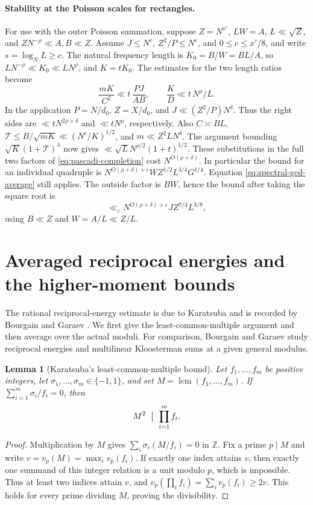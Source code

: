\documentclass[11pt]{amsart}
\numberwithin{equation}{section}
\newtheorem{lemma}[theorem]{Lemma}
\theoremstyle{remark}
\begin{document}
\paragraph{Stability at the Poisson scales for rectangles.}
For use with the outer Poisson summation, suppose
\(Z=N^{x'}\), \(L W=A\), \(L\ll\sqrt Z\),
and \(ZN^{-\rho}\ll A,B\ll Z\). Assume
\(J\le N^c\), \(Z^2/P\le N^c\), and \(0\le c\le x'/8\), and
write \(s=\log_N L\ge c\). The natural frequency length is
\(K_0=B/W=BL/A\), so
\(L N^{-\rho}\ll K_0\ll L N^\rho\), and \(K=tK_0\).
The estimates for the two length ratios become
\[
 \frac{mK}{C^2}\ll t\,\frac{PJ}{AB},\qquad
 \frac KD\ll t\,N^\rho/L .
\]
In the application \(P=N/d_0\), \(Z=X/d_0\),
and \(J\ll (Z^2/P)N^\delta\). Thus the right sides are
\(\ll t N^{2\rho+\delta}\) and \(\ll tN^\rho\), respectively.
Also \(C\asymp BL\),
\(\mathcal T\le B/\sqrt{mK}\ll(N^c/K)^{1/2}\), and
\(m\ll Z^2 L N^\delta\). The argument bounding
\(\sqrt K(1+\mathcal T)^\lambda\) now gives
\(\ll\sqrt L N^{\rho/2}(1+t)^{1/2}\).
These substitutions in the full two factors of
\eqref{eq:pascadi-completion} cost \(N^{O(\rho+\delta)}\).
In particular the bound for an individual quadruple is
\(N^{O(\rho+\delta)+\varepsilon}W Z^{1/2}L^{3/4}G^{1/4}\).
Equation \eqref{eq:spectral-gcd-average} still applies. The outside
factor is \(BW\), hence the bound after taking the square root is
\begin{equation}
 \ll_\varepsilon N^{O(\rho+\delta)+\varepsilon}
             J Z^{7/4}L^{3/8},
 \label{eq:spectral-rectangular}
\end{equation}
using \(B\ll Z\) and \(W=A/L\ll Z/L\).

\section{Averaged reciprocal energies and the higher-moment bounds}
\label{sec:higher-moments}

The rational reciprocal-energy estimate is due to Karatsuba and is
recorded by Bourgain and Garaev \cite[Lemma~4]{BGprime}. We first give the
least-common-multiple argument and then average over the actual moduli.
For comparison, Bourgain and Garaev \cite{BGrings} study reciprocal
energies and multilinear Kloosterman sums at a given general modulus.

\begin{lemma}[Karatsuba's least-common-multiple bound]
\label{lem:target-lcm}
Let \(f_1,\ldots,f_m\) be positive integers, let
\(\sigma_1,\ldots,\sigma_m\in\{-1,1\}\), and set
\(M=\operatorname{lcm}(f_1,\ldots,f_m)\).
If \(\sum_{i=1}^m \sigma_i/f_i=0\), then
\[
 M^2\ \bigm|\ \prod_{i=1}^m f_i .
\]
\end{lemma}
\begin{proof}
Multiplication by \(M\) gives \(\sum_i \sigma_i(M/f_i)=0\) in
\(\mathbb Z\).
Fix a prime \(p\mid M\) and write \(v=v_p(M)=\max_i v_p(f_i)\).
If exactly one index attains \(v\), then exactly one summand of this
integer relation is a unit modulo \(p\), which is impossible.
Thus at least two indices attain \(v\), and
\(v_p(\prod_i f_i)=\sum_i v_p(f_i)\ge 2v\).
This holds for every prime dividing \(M\), proving the divisibility.
\end{proof}
\end{document}
